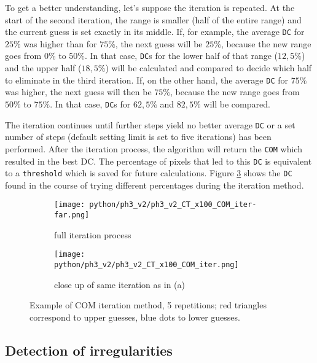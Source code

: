 To get a better understanding, let's suppose the iteration is repeated.
At the start of the second iteration, the range is smaller (half of the entire range) and the current guess is set exactly in its middle.
If, for example, the average \texttt{DC} for $25\%$ was higher than for $75\%$, the next guess will be $25\%$, because the new range goes from $0\%$ to $50\%$.
In that case, \texttt{DC}s for the lower half of that range ($12,5\%$) and the upper half ($18,5\%$) will be calculated and compared to decide which half to eliminate in the third iteration.
If, on the other hand, the average \texttt{DC} for $75\%$ was higher, the next guess will then be $75\%$, because the new range goes from $50\%$ to $75\%$.
In that case, \texttt{DC}s for $62,5\%$ and $82,5\%$ will be compared.

The iteration continues until further steps yield no better average \texttt{DC} or a set number of steps (default setting limit is set to five iterations) has been performed.
After the iteration process, the algorithm will return the \texttt{COM} which resulted in the best DC.
The percentage of pixels that led to this \texttt{DC} is equivalent to a \texttt{threshold} which is saved for future calculations.
Figure \ref{fig:COM_iteration} shows the \texttt{DC}  found in the course of trying different percentages during the iteration method.


\begin{figure}[!thb]
\centering
  \begin{subfigure}[b]{1\textwidth}
  \centering
    \texttt{[image: python/ph3\_v2/ph3\_v2\_CT\_x100\_COM\_iter-far.png]}
    \caption{full iteration process}
    \label{fig:CT_x100_iteration-far}
  \end{subfigure}
  \begin{subfigure}[b]{1\textwidth}
  \centering
    \texttt{[image: python/ph3\_v2/ph3\_v2\_CT\_x100\_COM\_iter.png]}
     \caption{close up of same iteration as in (a)}
     \label{fig:CT_x100_iteration}
  \end{subfigure}
  \caption[Example of COM iteration method, 5 repetitions.]{Example of COM iteration method, 5 repetitions; red triangles correspond to upper guesses, blue dots to lower guesses.}
  \label{fig:COM_iteration}
\end{figure}


\subsection{Detection of irregularities}

